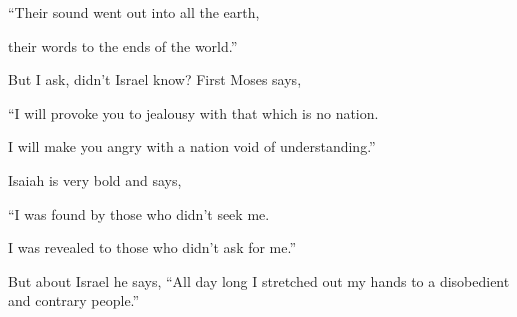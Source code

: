 {\par }{\Q “Their sound went out into all the earth,
\par }{\QB their words to the ends of the world.”
\par }{\PP {}But I ask, didn’t Israel know? First Moses says,
\par }{\Q “I will provoke you to jealousy with that which is no nation.
\par }{\QB I will make you angry with a nation void of understanding.”
\par }{\PP {}Isaiah is very bold and says,
\par }{\Q “I was found by those who didn’t seek me.
\par }{\QB I was revealed to those who didn’t ask for me.”
\par }{\PP {}But about Israel he says, “All day long I stretched out my hands to a disobedient and contrary people.”

}
